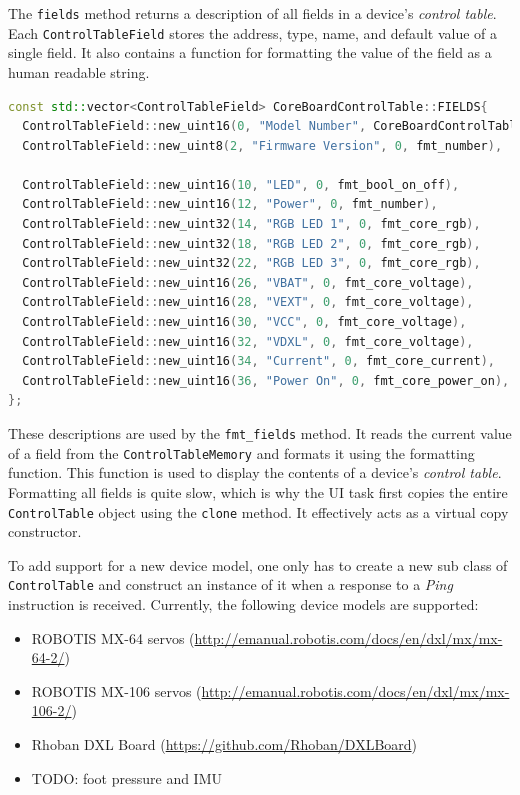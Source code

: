The \lstinline{fields} method returns a description of all fields in a device's \textit{control table}.
Each \lstinline{ControlTableField} stores the address, type, name, and default value of a single
field. It also contains a function for formatting the value of the field as a human readable string.

\begin{lstlisting}[language=C++, caption={Definition of the control table fields of a Rhoban DXL Board}]
const std::vector<ControlTableField> CoreBoardControlTable::FIELDS{
  ControlTableField::new_uint16(0, "Model Number", CoreBoardControlTable::MODEL_NUMBER, fmt_number),
  ControlTableField::new_uint8(2, "Firmware Version", 0, fmt_number),

  ControlTableField::new_uint16(10, "LED", 0, fmt_bool_on_off),
  ControlTableField::new_uint16(12, "Power", 0, fmt_number),
  ControlTableField::new_uint32(14, "RGB LED 1", 0, fmt_core_rgb),
  ControlTableField::new_uint32(18, "RGB LED 2", 0, fmt_core_rgb),
  ControlTableField::new_uint32(22, "RGB LED 3", 0, fmt_core_rgb),
  ControlTableField::new_uint16(26, "VBAT", 0, fmt_core_voltage),
  ControlTableField::new_uint16(28, "VEXT", 0, fmt_core_voltage),
  ControlTableField::new_uint16(30, "VCC", 0, fmt_core_voltage),
  ControlTableField::new_uint16(32, "VDXL", 0, fmt_core_voltage),
  ControlTableField::new_uint16(34, "Current", 0, fmt_core_current),
  ControlTableField::new_uint16(36, "Power On", 0, fmt_core_power_on),
};
\end{lstlisting}

These descriptions are used by the \lstinline{fmt_fields} method. It reads the current value of a
field from the \lstinline{ControlTableMemory} and formats it using the formatting function. This
function is used to display the contents of a device's \textit{control table}. Formatting all fields
is quite slow, which is why the UI task first copies the entire \lstinline{ControlTable} object using
the \lstinline{clone} method. It effectively acts as a virtual copy constructor.

To add support for a new device model, one only has to create a new sub class of \lstinline{ControlTable}
and construct an instance of it when a response to a \textit{Ping} instruction is received. Currently,
the following device models are supported:

\begin{itemize}
    \item ROBOTIS MX-64 servos (\url{http://emanual.robotis.com/docs/en/dxl/mx/mx-64-2/})
    \item ROBOTIS MX-106 servos (\url{http://emanual.robotis.com/docs/en/dxl/mx/mx-106-2/})
    \item Rhoban DXL Board (\url{https://github.com/Rhoban/DXLBoard})
    \item TODO: foot pressure and IMU
\end{itemize}
